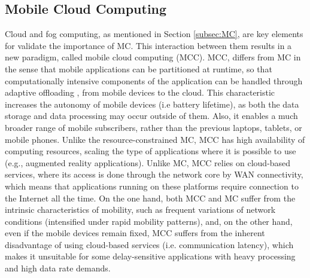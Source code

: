 \subsection{Mobile Cloud Computing}
Cloud and fog computing, as mentioned in Section \ref{subsec:MC}, are key elements for validate the importance of MC. This interaction between them results in a new paradigm, called mobile cloud computing (MCC). MCC, differs from MC in the sense that mobile applications can be partitioned at runtime, so that computationally intensive components of the application can be handled through adaptive offloading \cite{shiraz2013review}, from mobile devices to the cloud. This characteristic increases the autonomy of mobile devices (i.e battery lifetime), as both the data storage and data processing may occur outside of them. Also, it enables a much broader range of mobile subscribers, rather than the previous laptops, tablets, or mobile phones. Unlike the resource-constrained MC, MCC has high availability of computing resources, scaling the type of applications where it is possible to use (e.g., augmented reality applications). Unlike MC, MCC relies on cloud-based services, where its access is done through the network core by WAN connectivity, which means that applications running on these platforms require connection to the Internet all the time. On the one hand, both MCC and MC suffer from the intrinsic characteristics of mobility, such as frequent variations of network conditions (intensified under rapid mobility patterns), and, on the other hand, even if the mobile devices remain fixed, MCC suffers from the inherent disadvantage of using cloud-based services (i.e. communication latency), which makes it unsuitable for some delay-sensitive applications with heavy processing and high data rate demands.

